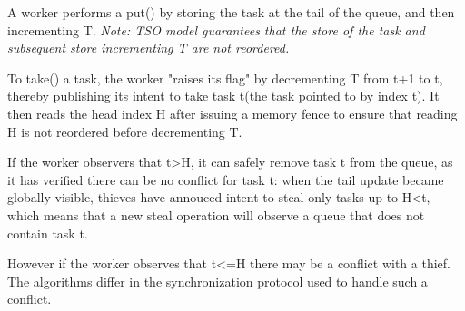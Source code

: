 \documentclass[a4paper]{article}
\begin{document}
A worker performs a put() by storing the task at the tail of the queue, and then incrementing T. \textit{Note: TSO model guarantees that the store of the task and subsequent store incrementing T are not reordered.}

To take() a task, the worker "raises its flag" by decrementing T from t+1 to t, thereby publishing its intent to take task t(the task pointed to by index t). It then reads the head index H after issuing a memory fence to ensure that reading H is not reordered before decrementing T.

If the worker observers that t>H, it can safely remove task t from the queue, as it has verified there can be no conflict for task t: when the tail update became globally visible, thieves have annouced intent to steal only tasks up to H<t, which means that a new steal operation will observe a queue that does not contain task t.

However if the worker observes that t<=H there may be a conflict with a thief. The algorithms differ in the synchronization protocol used to handle such a conflict.
\end{document}
